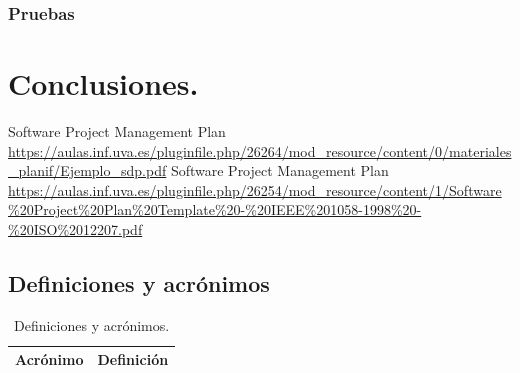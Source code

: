 \documentclass[a4paper,11pt, twoside]{article}
\begin{document}
\subsubsection{Pruebas}
\section{Conclusiones.}
\newpage
\renewcommand\refname{Bibliografía}
\begin{thebibliography}{99}
    Software Project Management Plan \url{https://aulas.inf.uva.es/pluginfile.php/26264/mod_resource/content/0/materiales_planif/Ejemplo_sdp.pdf}
    Software Project  
Management Plan \url{https://aulas.inf.uva.es/pluginfile.php/26254/mod_resource/content/1/Software\%20Project\%20Plan\%20Template\%20-\%20IEEE\%201058-1998\%20-\%20ISO\%2012207.pdf}
\end{thebibliography}

\newpage

\begin{appendices}
\addappheadtotoc
{}
\appendixpage

\renewcommand\thesubsection{Anexo \Roman{subsection}}

\subsection{Definiciones y acrónimos}\label{ANEXOI}
\begin{table}[!h]
        \centering
        \begin{tabular}{|c|c|}
        \hline
        \textbf{\large Acrónimo} & \textbf{\large Definición}\\
        \hline
        \end{tabular}
        \caption{Definiciones y acrónimos.}
        \label{ta:defyacr}
    \end{table}
\end{appendices}
\end{document}
